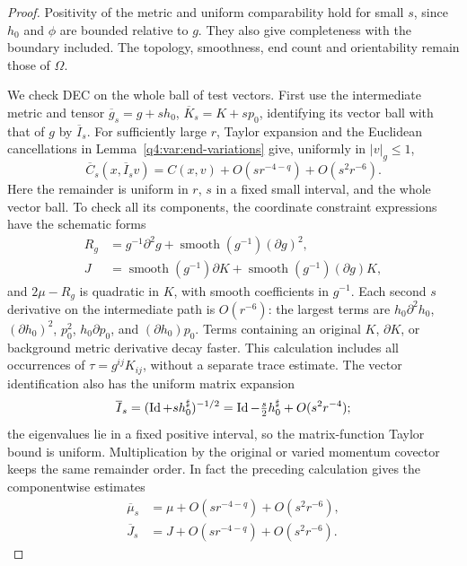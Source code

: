 \begin{proof}
Positivity of the metric and uniform comparability hold for small $s$,
since $h_0$ and $\phi$ are bounded relative to $g$. They also give
completeness with the boundary included. The topology, smoothness, end
count and orientability remain those of $\Omega$.

We check DEC on the whole ball of test vectors. First use the intermediate
metric and tensor
$\overline g_s=g+sh_0$, $\overline K_s=K+sp_0$, identifying its vector
ball with that of $g$ by $\overline I_s$. For sufficiently large $r$,
Taylor expansion and the Euclidean cancellations in
Lemma~\ref{q4:var:end-variations} give, uniformly in $|v|_g\le1$,
\[
 \overline C_s(x,\overline I_sv)
    =C(x,v)+O(sr^{-4-q})+O(s^2r^{-6}).
\]
Here the remainder is uniform in $r$, $s$ in a fixed small interval, and
the whole vector ball. To check all its components, the coordinate
constraint expressions have the schematic forms
\begin{align*}
 R_g&=g^{-1}\partial^2g+\operatorname{smooth}(g^{-1})(\partial g)^2,\\
 J&=\operatorname{smooth}(g^{-1})\partial K
       +\operatorname{smooth}(g^{-1})(\partial g)K,
\end{align*}
and $2\mu-R_g$ is quadratic in $K$, with smooth coefficients in $g^{-1}$.
Each second $s$ derivative on the intermediate path is $O(r^{-6})$:
the largest terms are $h_0\partial^2h_0$, $(\partial h_0)^2$, $p_0^2$,
$h_0\partial p_0$, and $(\partial h_0)p_0$. Terms containing an original
$K$, $\partial K$, or background metric derivative decay faster. This
calculation includes all occurrences of $\tau=g^{ij}K_{ij}$, without
a separate trace estimate. The vector identification also has the uniform
matrix expansion
\[
 \overline I_s=(\operatorname{Id}+s h_0^\sharp)^{-1/2}
       =\operatorname{Id}-\tfrac{s}{2}h_0^\sharp+O(s^2r^{-4});
\]
the eigenvalues lie in a fixed positive interval, so the matrix-function
Taylor bound is uniform. Multiplication by the original or varied
momentum covector keeps the same remainder order. In fact the preceding
calculation gives the componentwise estimates
\begin{equation}
\begin{aligned}
 \overline\mu_s&=\mu+O(sr^{-4-q})+O(s^2r^{-6}),\\
 \overline J_s&=J+O(sr^{-4-q})+O(s^2r^{-6}).
\end{aligned}
\label{q4:var:component-remainders}
\end{equation}


\end{proof}
